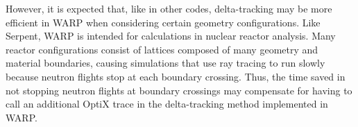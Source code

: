 However, it is expected that, like in other codes, delta-tracking may be more efficient in WARP when
considering certain geometry configurations. Like Serpent, WARP is intended for calculations in nuclear
reactor analysis. Many reactor configurations consist of lattices composed of many geometry and material
boundaries, causing simulations that use ray tracing to run slowly because 
neutron flights stop at each boundary crossing. Thus, the time saved in not stopping neutron
flights at boundary crossings may compensate for having to call an additional OptiX trace in the 
delta-tracking method implemented in WARP.

